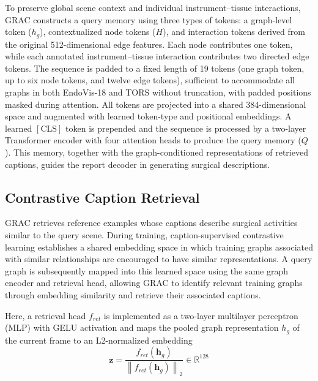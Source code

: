 \documentclass[11pt]{article}
\begin{document}
To preserve global scene context and individual instrument–tissue interactions, GRAC constructs a query memory using three types of tokens: a graph-level token ($h_g$), contextualized node tokens ($H$), and interaction tokens derived from the original 512-dimensional edge features. Each node contributes one token, while each annotated instrument–tissue interaction contributes two directed edge tokens. The sequence is padded to a fixed length of 19 tokens (one graph token, up to six node tokens, and twelve edge tokens), sufficient to accommodate all graphs in both EndoVis-18 and TORS without truncation, with padded positions masked during attention. All tokens are projected into a shared 384-dimensional space and augmented with learned token-type and positional embeddings. A learned $[\mathrm{CLS}]$ token is prepended and the sequence is processed by a two-layer Transformer encoder with four attention heads to produce the query memory ($Q$). This memory, together with the graph-conditioned representations of retrieved captions, guides the report decoder in generating surgical descriptions.

\subsection{Contrastive Caption Retrieval}\label{subsec3.3}

GRAC retrieves reference examples whose captions describe surgical activities similar to the query scene. During training, caption-supervised contrastive learning establishes a shared embedding space in which training graphs associated with similar relationships are encouraged to have similar representations. A query graph is subsequently mapped into this learned space using the same graph encoder and retrieval head, allowing GRAC to identify relevant training graphs through embedding similarity and retrieve their associated captions.

Here, a retrieval head $f_{ret}$ is implemented as a two-layer multilayer perceptron (MLP) with GELU activation and maps the pooled graph representation $h_{g}$ of the current frame to an L2-normalized embedding
\begin{equation}
\mathbf{z} = \frac{f_{ret}(\mathbf{h}_{g})}{\left\| f_{ret}(\mathbf{h}_{g}) \right\|_{2}} \in \mathbb{R}^{128}
\label{eq1}
\end{equation}
\end{document}
